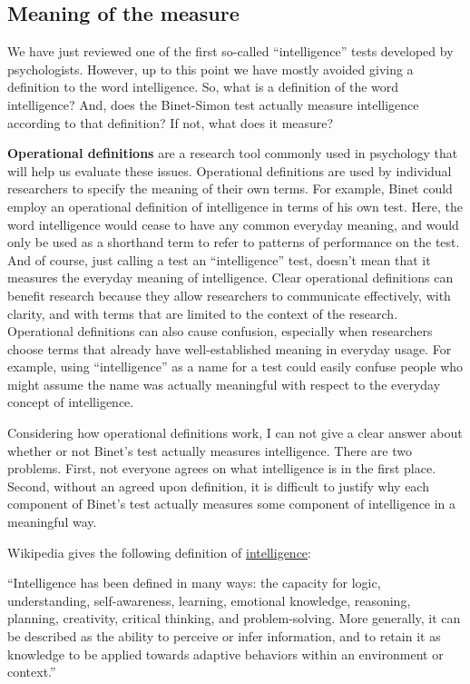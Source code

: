 \documentclass[
  oneside,
  12pt]{crumpbook}
\begin{document}
\hypertarget{meaning-of-the-measure}{%
\subsection{Meaning of the measure}\label{meaning-of-the-measure}}

We have just reviewed one of the first so-called ``intelligence'' tests developed by psychologists. However, up to this point we have mostly avoided giving a definition to the word intelligence. So, what is a definition of the word intelligence? And, does the Binet-Simon test actually measure intelligence according to that definition? If not, what does it measure?

\textbf{Operational definitions} are a research tool commonly used in psychology that will help us evaluate these issues. Operational definitions are used by individual researchers to specify the meaning of their own terms. For example, Binet could employ an operational definition of intelligence in terms of his own test. Here, the word intelligence would cease to have any common everyday meaning, and would only be used as a shorthand term to refer to patterns of performance on the test. And of course, just calling a test an ``intelligence'' test, doesn't mean that it measures the everyday meaning of intelligence. Clear operational definitions can benefit research because they allow researchers to communicate effectively, with clarity, and with terms that are limited to the context of the research. Operational definitions can also cause confusion, especially when researchers choose terms that already have well-established meaning in everyday usage. For example, using ``intelligence'' as a name for a test could easily confuse people who might assume the name was actually meaningful with respect to the everyday concept of intelligence.

Considering how operational definitions work, I can not give a clear answer about whether or not Binet's test actually measures intelligence. There are two problems. First, not everyone agrees on what intelligence is in the first place. Second, without an agreed upon definition, it is difficult to justify why each component of Binet's test actually measures some component of intelligence in a meaningful way.

Wikipedia gives the following definition of \href{https://en.wikipedia.org/wiki/Intelligence}{intelligence}:

``Intelligence has been defined in many ways: the capacity for logic, understanding, self-awareness, learning, emotional knowledge, reasoning, planning, creativity, critical thinking, and problem-solving. More generally, it can be described as the ability to perceive or infer information, and to retain it as knowledge to be applied towards adaptive behaviors within an environment or context.''
\end{document}
